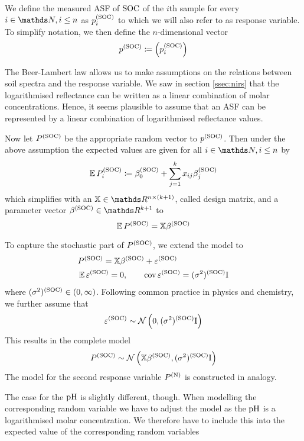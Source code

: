 	
		We define the measured ASF of $\mathrm{SOC}$ of the $i$th sample for every $i\in\SN,i\leq n$ as $p^{\mathrm{(SOC)}}_i$ to which we will also refer to as response variable.
		To simplify notation, we then define the $n$-dimensional vector
		\[
			p^{\mathrm{(SOC)}} \coloneqq \left( p^{\mathrm{(SOC)}}_i \right)
		\]

		The Beer-Lambert law allows us to make assumptions on the relations between soil spectra and the response variable.
		We saw in section \ref{ssec:nirs} that the logarithmised reflectance can be written as a linear combination of molar concentrations.
		Hence, it seems plausible to assume that an ASF can be represented by a linear combination of logarithmised reflectance values.

		Now let $P^{\mathrm{(SOC)}}$ be the appropriate random vector to $p^{\mathrm{(SOC)}}$.
		Then under the above assumption the expected values are given for all $i \in \SN, i \leq n$ by
		\[
			\operatorname{\mathbb{E}} P_i^{\mathrm{(SOC)}} \coloneqq \beta^{\mathrm{(SOC)}}_0 + \sum_{j = 1}^k{x_{ij}\beta^{\mathrm{(SOC)}}_j} 
		\]
		which simplifies with an $\mathbb{X} \in \SR^{n \times (k+1)}$, called design matrix, and a parameter vector $\beta^\m{(SOC)} \in \SR^{k+1}$ to
		\[
			\operatorname{\mathbb{E}} P^{\mathrm{(SOC)}} = \mathbb{X}\beta^{\mathrm{(SOC)}}
		\]
		
		To capture the stochastic part of $P^{\mathrm{(SOC)}}$, we extend the model to
		\begin{alignat*}{3}
			&P^{\mathrm{(SOC)}} = \mathbb{X}\beta^{\mathrm{(SOC)}} + \varepsilon^{\mathrm{(SOC)}} \\
			&\operatorname{\mathbb{E}} \varepsilon^{\mathrm{(SOC)}} = 0, \qquad \operatorname{cov} \varepsilon^{\mathrm{(SOC)}} = (\sigma^2)^{\mathrm{(SOC)}} \mathrm{I}
		\end{alignat*}
		where $(\sigma^2)^{\mathrm{(SOC)}} \in (0,\infty)$. Following common practice in physics and chemistry, we further assume that 
		\[
			\varepsilon^{\mathrm{(SOC)}} \sim \mathcal{N} \left( 0,(\sigma^2)^{\mathrm{(SOC)}}\mathrm{I} \right)
		\]
		This results in the complete model
		\[
			P^{\mathrm{(SOC)}} \sim \mathcal{N} \left( \mathbb{X}\beta^{\mathrm{(SOC)}},(\sigma^2)^{\mathrm{(SOC)}} \mathrm{I} \right)
		\]
		The model for the second response variable $P^{\mathrm{(N)}}$ is constructed in analogy.
		
		The case for the $\mathrm{pH}$ is slightly different, though. 
		When modelling the corresponding random variable we have to adjust the model as the $\mathrm{pH}$ is a logarithmised molar concentration.
		We therefore have to include this into the expected value of the corresponding random variables
		

